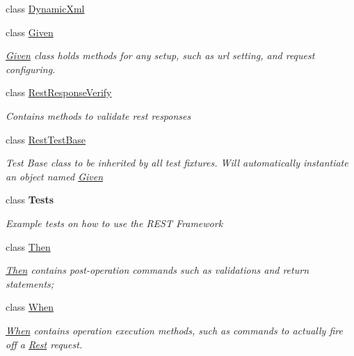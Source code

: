 \begin{DoxyCompactItemize}
\item 
class \hyperlink{class_proto_test_1_1_golem_1_1_rest_1_1_dynamic_xml}{Dynamic\-Xml}
\item 
class \hyperlink{class_proto_test_1_1_golem_1_1_rest_1_1_given}{Given}
\begin{DoxyCompactList}\small\item\em \hyperlink{class_proto_test_1_1_golem_1_1_rest_1_1_given}{Given} class holds methods for any setup, such as url setting, and request configuring. \end{DoxyCompactList}\item 
class \hyperlink{class_proto_test_1_1_golem_1_1_rest_1_1_rest_response_verify}{Rest\-Response\-Verify}
\begin{DoxyCompactList}\small\item\em Contains methods to validate rest responses \end{DoxyCompactList}\item 
class \hyperlink{class_proto_test_1_1_golem_1_1_rest_1_1_rest_test_base}{Rest\-Test\-Base}
\begin{DoxyCompactList}\small\item\em Test Base class to be inherited by all test fixtures. Will automatically instantiate an object named \hyperlink{class_proto_test_1_1_golem_1_1_rest_1_1_given}{Given} \end{DoxyCompactList}\item 
class {\bfseries Tests}
\begin{DoxyCompactList}\small\item\em Example tests on how to use the R\-E\-S\-T Framework \end{DoxyCompactList}\item 
class \hyperlink{class_proto_test_1_1_golem_1_1_rest_1_1_then}{Then}
\begin{DoxyCompactList}\small\item\em \hyperlink{class_proto_test_1_1_golem_1_1_rest_1_1_then}{Then} contains post-\/operation commands such as validations and return statements; \end{DoxyCompactList}\item 
class \hyperlink{class_proto_test_1_1_golem_1_1_rest_1_1_when}{When}
\begin{DoxyCompactList}\small\item\em \hyperlink{class_proto_test_1_1_golem_1_1_rest_1_1_when}{When} contains operation execution methods, such as commands to actually fire off a \hyperlink{namespace_proto_test_1_1_golem_1_1_rest}{Rest} request. \end{DoxyCompactList}\end{DoxyCompactItemize}
